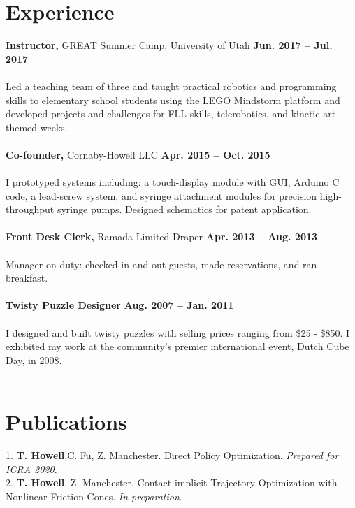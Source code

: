 \documentclass[margin,line]{res}
\begin{document}
\begin{resume}
\section{\sc Experience}
{\bf Instructor,} GREAT Summer Camp, University of Utah
\hfill {\bf Jun. 2017 – Jul. 2017}\\
\\
Led a teaching team of three and taught practical robotics and programming skills to elementary school students using the LEGO Mindstorm platform and developed projects and challenges for FLL skills, telerobotics, and kinetic-art themed weeks.\\
\\
{\bf Co-founder,} Cornaby-Howell LLC
\hfill {\bf Apr. 2015 – Oct. 2015}\\
\\
I prototyped systems including: a touch-display module with GUI, Arduino C code, a lead-screw system,
and syringe attachment modules for precision high-throughput syringe pumps. Designed schematics for patent application.\\
\\
{\bf Front Desk Clerk,} Ramada Limited Draper
\hfill {\bf Apr. 2013 – Aug. 2013}\\
\\
Manager on duty: checked in and out guests, made reservations, and ran breakfast.\\
\\
{\bf Twisty Puzzle Designer} 
\hfill {\bf Aug. 2007 – Jan. 2011}\\
\\
I designed and built twisty puzzles with selling prices ranging from \$25 - \$850. I exhibited my work at
the community’s premier international event, Dutch Cube Day, in 2008.\\
\\


\section{\sc Publications}
1. \textbf{T. Howell},C. Fu, Z. Manchester. Direct Policy Optimization. \textit{Prepared for ICRA 2020}.\\

2. \textbf{T. Howell}, Z. Manchester. Contact-implicit Trajectory Optimization with Nonlinear Friction Cones. \textit{In preparation}.\\


\end{resume}
\end{document}
